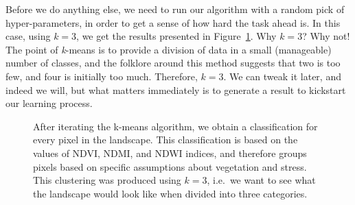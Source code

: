 \documentclass[
  letterpaper,
]{scrbook}
\begin{document}
Before we do anything else, we need to run our algorithm with a random
pick of hyper-parameters, in order to get a sense of how hard the task
ahead is. In this case, using \(k = 3\), we get the results presented in
Figure~\ref{fig-kmeans-initial-landscape}. Why \(k=3\)? Why not! The
point of \emph{k}-means is to provide a division of data in a small
(manageable) number of classes, and the folklore around this method
suggests that two is too few, and four is initially too much. Therefore,
\(k=3\). We can tweak it later, and indeed we will, but what matters
immediately is to generate a result to kickstart our learning process.

\begin{figure}[pbt]


\caption{\label{fig-kmeans-initial-landscape}After iterating the k-means
algorithm, we obtain a classification for every pixel in the landscape.
This classification is based on the values of NDVI, NDMI, and NDWI
indices, and therefore groups pixels based on specific assumptions about
vegetation and stress. This clustering was produced using \(k=3\),
i.e.~we want to see what the landscape would look like when divided into
three categories.}

\end{figure}%
\end{document}
